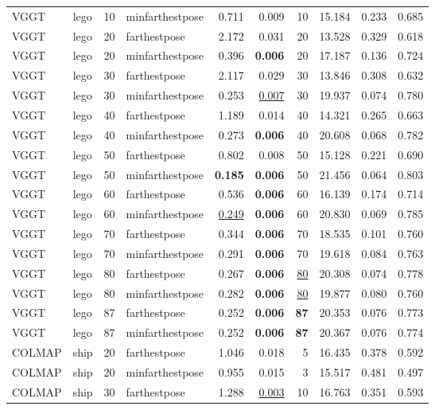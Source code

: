\begin{table}[H]
\begin{tabular}{llrlrrrrrr}
VGGT & lego & 10 & minfarthestpose & 0.711 & 0.009 & 10 & 15.184 & 0.233 & 0.685 \\
VGGT & lego & 20 & farthestpose & 2.172 & 0.031 & 20 & 13.528 & 0.329 & 0.618 \\
VGGT & lego & 20 & minfarthestpose & 0.396 & \textbf{0.006} & 20 & 17.187 & 0.136 & 0.724 \\
VGGT & lego & 30 & farthestpose & 2.117 & 0.029 & 30 & 13.846 & 0.308 & 0.632 \\
VGGT & lego & 30 & minfarthestpose & 0.253 & \underline{0.007} & 30 & 19.937 & 0.074 & 0.780 \\
VGGT & lego & 40 & farthestpose & 1.189 & 0.014 & 40 & 14.321 & 0.265 & 0.663 \\
VGGT & lego & 40 & minfarthestpose & 0.273 & \textbf{0.006} & 40 & 20.608 & 0.068 & 0.782 \\
VGGT & lego & 50 & farthestpose & 0.802 & 0.008 & 50 & 15.128 & 0.221 & 0.690 \\
VGGT & lego & 50 & minfarthestpose & \textbf{0.185} & \textbf{0.006} & 50 & 21.456 & 0.064 & 0.803 \\
VGGT & lego & 60 & farthestpose & 0.536 & \textbf{0.006} & 60 & 16.139 & 0.174 & 0.714 \\
VGGT & lego & 60 & minfarthestpose & \underline{0.249} & \textbf{0.006} & 60 & 20.830 & 0.069 & 0.785 \\
VGGT & lego & 70 & farthestpose & 0.344 & \textbf{0.006} & 70 & 18.535 & 0.101 & 0.760 \\
VGGT & lego & 70 & minfarthestpose & 0.291 & \textbf{0.006} & 70 & 19.618 & 0.084 & 0.763 \\
VGGT & lego & 80 & farthestpose & 0.267 & \textbf{0.006} & \underline{80} & 20.308 & 0.074 & 0.778 \\
VGGT & lego & 80 & minfarthestpose & 0.282 & \textbf{0.006} & \underline{80} & 19.877 & 0.080 & 0.760 \\
VGGT & lego & 87 & farthestpose & 0.252 & \textbf{0.006} & \textbf{87} & 20.353 & 0.076 & 0.773 \\
VGGT & lego & 87 & minfarthestpose & 0.252 & \textbf{0.006} & \textbf{87} & 20.367 & 0.076 & 0.774 \\
\midrule
COLMAP & ship & 20 & farthestpose & 1.046 & 0.018 & 5 & 16.435 & 0.378 & 0.592 \\
COLMAP & ship & 20 & minfarthestpose & 0.955 & 0.015 & 3 & 15.517 & 0.481 & 0.497 \\
COLMAP & ship & 30 & farthestpose & 1.288 & \underline{0.003} & 10 & 16.763 & 0.351 & 0.593 \\

\end{tabular}
\end{table}
